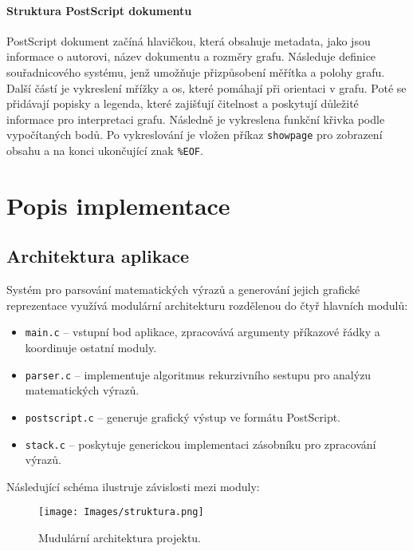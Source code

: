\documentclass[12pt]{article} %
\begin{document}
\paragraph{Struktura PostScript dokumentu}
PostScript dokument začíná hlavičkou, která obsahuje metadata, jako jsou informace o autorovi, název dokumentu a rozměry grafu. Následuje definice souřadnicového systému, jenž umožňuje přizpůsobení měřítka a polohy grafu. Další částí je vykreslení mřížky a os, které pomáhají při orientaci v grafu. Poté se přidávají popisky a legenda, které zajišťují čitelnost a poskytují důležité informace pro interpretaci grafu. Následně je vykreslena funkční křivka podle vypočítaných bodů.  Po vykreslování je vložen příkaz \texttt{showpage} pro zobrazení obsahu a na konci ukončující znak \texttt{\%EOF}. 


\section{Popis implementace}

\subsection{Architektura aplikace}

Systém pro parsování matematických výrazů a generování jejich grafické reprezentace využívá modulární architekturu rozdělenou do čtyř hlavních modulů:

\begin{itemize}
    \item \texttt{main.c} – vstupní bod aplikace, zpracovává argumenty příkazové řádky a koordinuje ostatní moduly.
    \item \texttt{parser.c} – implementuje algoritmus rekurzivního sestupu pro analýzu matematických výrazů.
    \item \texttt{postscript.c} – generuje grafický výstup ve formátu PostScript.
    \item \texttt{stack.c} – poskytuje generickou implementaci zásobníku pro zpracování výrazů.
\end{itemize}

\noindent Následující schéma ilustruje závislosti mezi moduly:

\begin{figure}[h!]
    \centering
    \texttt{[image: Images/struktura.png]} %
    \caption{Mudulární architektura projektu.}
    \label{fig:example-svg}
\end{figure}
\newpage
\end{document}
